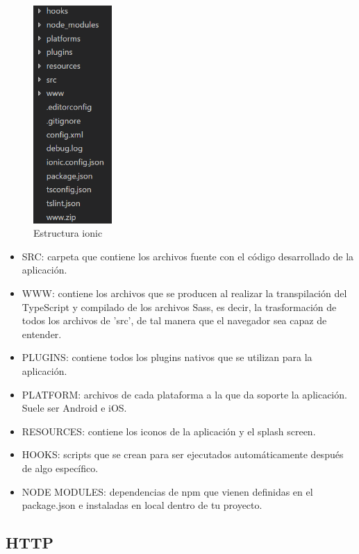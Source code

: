 \documentclass[a4paper, 12pt]{book}
\begin{document}
\begin{figure}[H]
  \centering
  \includegraphics[width=3cm, keepaspectratio]{img/estructura_ionic}
  \caption{Estructura ionic}
  \label{figura:estructura_ionic}
\end{figure}

\begin{itemize}
  \item SRC: carpeta que contiene los archivos fuente con el c\'odigo desarrollado de la aplicaci\'on.
 \item WWW: contiene los archivos que se producen al realizar la transpilaci\'on del TypeScript y compilado de los archivos Sass, es decir, la trasformaci\'on de todos los archivos de 'src', de tal manera que el navegador sea capaz de entender.
 \item PLUGINS: contiene todos los plugins nativos que se utilizan para la aplicaci\'on.
 \item PLATFORM: archivos de cada plataforma a la que da soporte la aplicaci\'on. Suele ser Android e iOS.
 \item RESOURCES: contiene los iconos de la aplicaci\'on y el splash screen.
 \item HOOKS: scripts que se crean para ser ejecutados autom\'aticamente despu\'es de algo espec\'ifico.
\item NODE MODULES: dependencias de npm que vienen definidas en el package.json e instaladas en local dentro de tu proyecto.

\end{itemize}

\subsection{HTTP}
\label{subsec:estilo}
\end{document}
